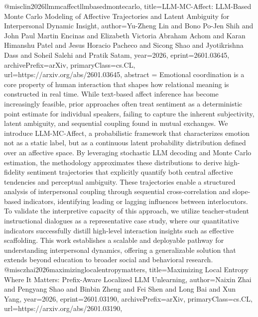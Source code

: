{}@misc{lin2026llmmcaffectllmbasedmontecarlo,
      title={LLM-MC-Affect: LLM-Based Monte Carlo Modeling of Affective Trajectories and Latent Ambiguity for Interpersonal Dynamic Insight}, 
      author={Yu-Zheng Lin and Bono Po-Jen Shih and John Paul Martin Encinas and Elizabeth Victoria Abraham Achom and Karan Himanshu Patel and Jesus Horacio Pacheco and Sicong Shao and Jyotikrishna Dass and Soheil Salehi and Pratik Satam},
      year={2026},
      eprint={2601.03645},
      archivePrefix={arXiv},
      primaryClass={cs.CL},
      url={https://arxiv.org/abs/2601.03645},
      abstract = {Emotional coordination is a core property of human interaction that shapes how relational meaning is constructed in real time. While text-based affect inference has become increasingly feasible, prior approaches often treat sentiment as a deterministic point estimate for individual speakers, failing to capture the inherent subjectivity, latent ambiguity, and sequential coupling found in mutual exchanges. We introduce LLM-MC-Affect, a probabilistic framework that characterizes emotion not as a static label, but as a continuous latent probability distribution defined over an affective space. By leveraging stochastic LLM decoding and Monte Carlo estimation, the methodology approximates these distributions to derive high-fidelity sentiment trajectories that explicitly quantify both central affective tendencies and perceptual ambiguity. These trajectories enable a structured analysis of interpersonal coupling through sequential cross-correlation and slope-based indicators, identifying leading or lagging influences between interlocutors. To validate the interpretive capacity of this approach, we utilize teacher-student instructional dialogues as a representative case study, where our quantitative indicators successfully distill high-level interaction insights such as effective scaffolding. This work establishes a scalable and deployable pathway for understanding interpersonal dynamics, offering a generalizable solution that extends beyond education to broader social and behavioral research.}
}@misc{zhai2026maximizinglocalentropymatters,
      title={Maximizing Local Entropy Where It Matters: Prefix-Aware Localized LLM Unlearning}, 
      author={Naixin Zhai and Pengyang Shao and Binbin Zheng and Fei Shen and Long Bai and Xun Yang},
      year={2026},
      eprint={2601.03190},
      archivePrefix={arXiv},
      primaryClass={cs.CL},
      url={https://arxiv.org/abs/2601.03190},
}
